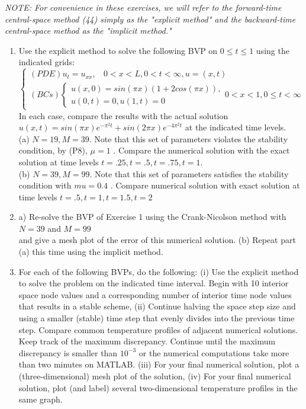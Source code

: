 \documentclass[../main.tex]{subfiles}
\begin{document}
\textit{NOTE: For convenience in these exercises, we will refer to the forward-time central-space method (44) simply as the "explicit method" and the backward-time central-space method as the "implicit method."} 

\begin{enumerate}
	\item
		Use the explicit method to solve the following BVP on $0\leqslant t \leqslant 1$ using the indicated grids:
$$\begin{cases} 
	(PDE) u_t=u_{xx},
	~~~~0<x<L, 0<t<\infty,u=(x,t)\\
(BCs)
		\begin{cases}
		u(x,0)=sin(\pi x)(1+2cos(\pi x)),\\
		u(0,t)=0, u(1,t)=0
		\end{cases}
		0 < x < 1, 0 \leqslant t < \infty 
	\end{cases}$$
In each case, compare the results with the actual solution $ u(x,t)=sin(\pi x)e^{-\pi^2t}+sin(2\pi x)e^{-4\pi^2t}$ at the indicated time levels. 
\\
(a) $N = 19, M = 39$. Note that this set of parameters violates the stability condition, by (P8), 
 $\mu= 1$ . Compare the numerical solution with the exact solution at time levels $t = .25, t = .5,  t=.75, t= 1$. 
\\
(b) $N= 39, M= 99$. Note that this set of parameters satisfies the stability condition with $mu = 0.4$ . 
Compare numerical solution with exact solution at time levels $t = .5, t = 1, t = 1.5, t = 2$
	\item
	a) Re-solve the BVP of Exercise 1 using the Crank-Nicolson method with $N = 39$ and $M=99$ 
\\
and give a mesh plot of the error of this numerical solution. 
(b) Repeat part (a) this time using the implicit method. 
	\item
	For each of the following BVPs, do the following: (i) Use the explicit method to solve the problem on the indicated time interval. Begin with 10 interior space node values and a corresponding number of interior time node values that results in a stable scheme, (ii) Continue halving the space step size and using a smaller (stable) time step that evenly divides into the previous time step. Compare common temperature profiles of adjacent numerical solutions. Keep track of the maximum discrepancy. Continue until the maximum discrepancy is smaller than $10^{-3}$ or the numerical computations take more than two minutes on MATLAB. (iii) For your final numerical solution, plot a (three-dimensional) mesh plot of the solution, (iv) For your final numerical solution, plot (and label) several two-dimensional temperature profiles in the same graph.

\end{enumerate}
\end{document}
